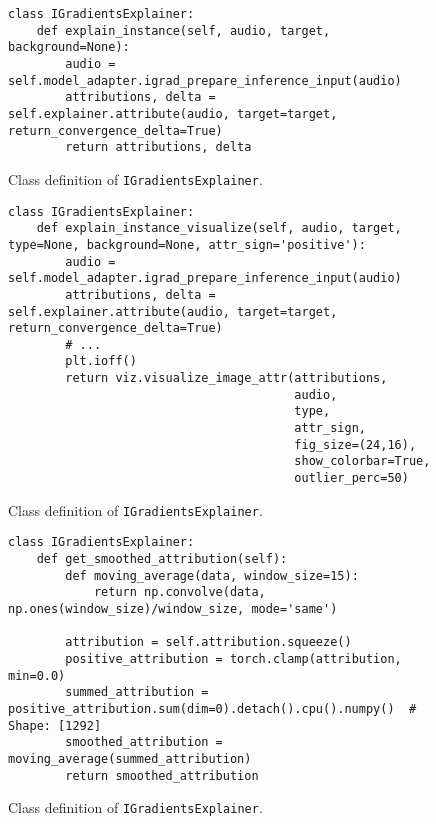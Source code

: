 \documentclass[
    bindingoffset=5mm,  %
    footnoteindent=3mm, %
    hyphenation=true    %
]{src/wut-thesis}
\begin{document}
\begin{figure}%
\begin{verbatim}
class IGradientsExplainer:
    def explain_instance(self, audio, target, background=None):
        audio = self.model_adapter.igrad_prepare_inference_input(audio)
        attributions, delta = self.explainer.attribute(audio, target=target, return_convergence_delta=True)
        return attributions, delta
\end{verbatim}
\caption{Class definition of \texttt{IGradientsExplainer}.}
\label{fig:explain_instance}
\end{figure}

\begin{figure}%
\begin{verbatim}
class IGradientsExplainer:
    def explain_instance_visualize(self, audio, target, type=None, background=None, attr_sign='positive'):
        audio = self.model_adapter.igrad_prepare_inference_input(audio)
        attributions, delta = self.explainer.attribute(audio, target=target, return_convergence_delta=True)
        # ...
        plt.ioff()
        return viz.visualize_image_attr(attributions,
                                        audio,
                                        type,
                                        attr_sign,
                                        fig_size=(24,16),
                                        show_colorbar=True,
                                        outlier_perc=50)
\end{verbatim}
\caption{Class definition of \texttt{IGradientsExplainer}.}
\label{fig:explain_instance_visualize}
\end{figure}

\begin{figure}%
\begin{verbatim}
class IGradientsExplainer:
    def get_smoothed_attribution(self):
        def moving_average(data, window_size=15):
            return np.convolve(data, np.ones(window_size)/window_size, mode='same')

        attribution = self.attribution.squeeze()
        positive_attribution = torch.clamp(attribution, min=0.0)
        summed_attribution = positive_attribution.sum(dim=0).detach().cpu().numpy()  # Shape: [1292]
        smoothed_attribution = moving_average(summed_attribution)
        return smoothed_attribution
\end{verbatim}
\caption{Class definition of \texttt{IGradientsExplainer}.}
\label{fig:get_smoothed_attribution}
\end{figure}
\end{document}
